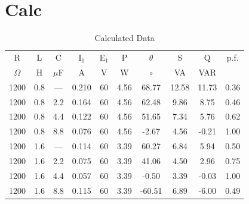 \documentclass{article}
\begin{document}
\section{Calc}
\begin{table}[h]
  \begin{center}
    \begin{tabular}{cccccccccc}
      \hline
      R & L & C & I\(_1\) & E$_1$ & P & \(\theta\) & S & Q & p.f. \\
      \(\Omega\) & H & \(\mu\)F & A & V & W & \(\circ\) & VA & VAR & \\
      \hline
      1200 & 0.8 & --- & 0.210 & 60 & 4.56 &  68.77 & 12.58 & 11.73 & 0.36 \\
      1200 & 0.8 & 2.2 & 0.164 & 60 & 4.56 &  62.48 &  9.86 &  8.75 & 0.46 \\
      1200 & 0.8 & 4.4 & 0.122 & 60 & 4.56 &  51.65 &  7.34 &  5.76 & 0.62 \\
      1200 & 0.8 & 8.8 & 0.076 & 60 & 4.56 &  -2.67 &  4.56 & -0.21 & 1.00 \\
      1200 & 1.6 & --- & 0.114 & 60 & 3.39 &  60.27 &  6.84 &  5.94 & 0.50 \\
      1200 & 1.6 & 2.2 & 0.075 & 60 & 3.39 &  41.06 &  4.50 &  2.96 & 0.75 \\
      1200 & 1.6 & 4.4 & 0.057 & 60 & 3.39 &  -0.50 &  3.39 & -0.03 & 1.00 \\
      1200 & 1.6 & 8.8 & 0.115 & 60 & 3.39 & -60.51 &  6.89 & -6.00 & 0.49 \\
      \hline
    \end{tabular}
    \caption{Calculated Data}
    \label{calc_dat}
  \end{center}
\end{table}
\end{document}
